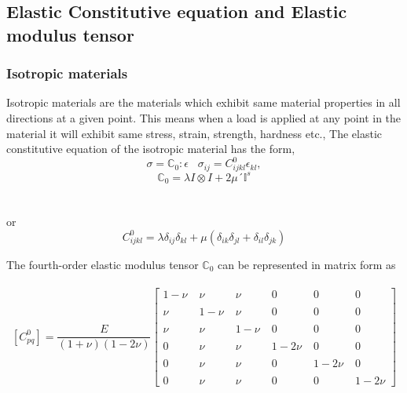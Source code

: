 \documentclass[a4paper,12pt]{extarticle}
\begin{document}
\subsection{Elastic Constitutive equation and Elastic modulus tensor}
\subsubsection{Isotropic materials}
\indent\indent\indent Isotropic materials are the materials which exhibit same material properties in all directions at a given point. This means when a load is applied at any point in the material it will exhibit same stress, strain, strength, hardness etc., The elastic constitutive equation of the isotropic material has the form, 
\begin{equation}
  \sigma = \mathbb{C}_{0} : \epsilon   \;\;\;  \sigma_{ij}  =  C^{0}_{ijkl}\epsilon_{kl},
\end{equation}
\begin{equation}
\mathbb{C}_{0} =  \lambda I \otimes I  +  2\mu ´\mathbb{I}^{s}
\end{equation}\\
\\
or
\begin{equation}
C^{0}_{ijkl} = \lambda\delta_{ij}\delta_{kl}  +  \mu(\delta_{ik}\delta_{jl}+\delta_{il}\delta_{jk})
\end{equation}

The fourth-order elastic modulus tensor $\mathbb{C}_{0}$ can be represented in matrix form as 
\\
\\
$$
[C^{0}_{pq}] =  \frac{E}{(1 + \nu)(1 - 2\nu)}
 \begin{bmatrix}
  1 - \nu \; & \nu \;& \nu\; & 0 \;& 0 \;& 0 \\
  \\
  \nu \; & 1-\nu \;& \nu \;& 0 \;& 0 \;& 0 \\
  \\
  \nu \;& \nu \;& 1-\nu \;& 0 \;& 0 \;& 0 \\
  \\
  0 \;& \nu \;& \nu \;& 1 - 2\nu \;& 0 \;& 0 \\
  \\
  0 \;& \nu \;& \nu \;& 0 \;& 1 - 2\nu\;& 0 \\
  \\
  0\;& \nu \;& \nu \;& 0 \;& 0 \;&1 - 2\nu  
 \end{bmatrix}
 $$
 \\
 \\
\end{document}
